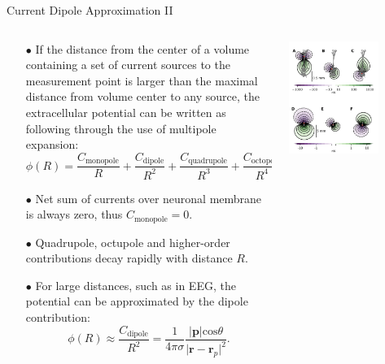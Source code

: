 \documentclass[aspectratio=169, 9pt]{beamer}
\begin{document}
\begin{frame}{Current Dipole Approximation II}
  \begin{columns}
    \begin{column}{0.5\textwidth}
      \begin{itemize}
        \item[$\bullet$] If the distance from the center of a volume containing a set of current sources to the measurement point is larger than the maximal distance from volume center to any source, the extracellular potential can be written as following through the use of multipole expansion:
          \begin{equation}
            \phi(R) = \frac{C_\text{monopole}}{R} + \frac{C_\text{dipole}}{R^2} + \frac{C_\text{quadrupole}}{R^3} + \frac{C_\text{octopole}}{R^4} + \ldots
          \end{equation}
        \item[$\bullet$] Net sum of currents over neuronal membrane is always zero, thus $C_\text{monopole} = 0$.
        \item[$\bullet$] Quadrupole, octupole and higher-order contributions decay rapidly with distance $R$.
        \item[$\bullet$] For large distances, such as in EEG, the potential can be approximated by the dipole contribution:
          \begin{equation}
            \phi(R) \approx \frac{C_\text{dipole}}{R^2} = \frac{1}{4\pi\sigma}\frac{|\textbf{p}| \text{cos} \theta}{\lvert\textbf{r}-\textbf{r}_p\rvert^2}.
          \end{equation}
      \end{itemize}
    \end{column}
    \begin{column}{0.5\textwidth}
      \includegraphics[width=0.7\textwidth]{figures/dipole_pattern.png}
    \end{column}
  \end{columns}
\end{frame}
\end{document}
